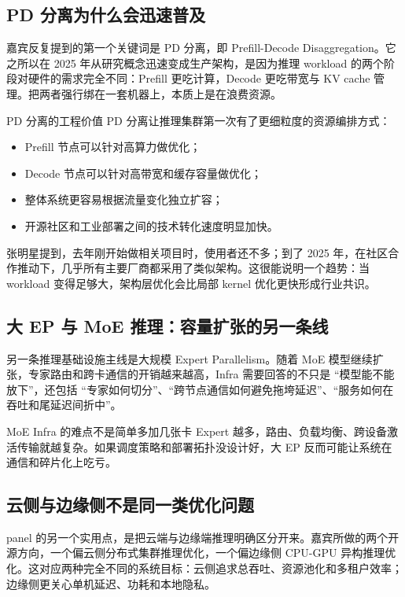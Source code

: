 \documentclass[a4paper]{article}
\begin{document}
\subsection{PD 分离为什么会迅速普及}
嘉宾反复提到的第一个关键词是 PD 分离，即 Prefill-Decode Disaggregation。它之所以在 2025 年从研究概念迅速变成生产架构，是因为推理 workload 的两个阶段对硬件的需求完全不同：Prefill 更吃计算，Decode 更吃带宽与 KV cache 管理。把两者强行绑在一套机器上，本质上是在浪费资源。

\begin{importantbox}{PD 分离的工程价值}
PD 分离让推理集群第一次有了更细粒度的资源编排方式：
\begin{itemize}
  \item Prefill 节点可以针对高算力做优化；
  \item Decode 节点可以针对高带宽和缓存容量做优化；
  \item 整体系统更容易根据流量变化独立扩容；
  \item 开源社区和工业部署之间的技术转化速度明显加快。
\end{itemize}
\end{importantbox}

张明星提到，去年刚开始做相关项目时，使用者还不多；到了 2025 年，在社区合作推动下，几乎所有主要厂商都采用了类似架构。这很能说明一个趋势：当 workload 变得足够大，架构层优化会比局部 kernel 优化更快形成行业共识。

\subsection{大 EP 与 MoE 推理：容量扩张的另一条线}
另一条推理基础设施主线是大规模 Expert Parallelism。随着 MoE 模型继续扩张，专家路由和跨卡通信的开销越来越高，Infra 需要回答的不只是 ``模型能不能放下''，还包括 ``专家如何切分''、``跨节点通信如何避免拖垮延迟''、``服务如何在吞吐和尾延迟间折中''。

\begin{warningbox}{MoE Infra 的难点不是简单多加几张卡}
Expert 越多，路由、负载均衡、跨设备激活传输就越复杂。如果调度策略和部署拓扑没设计好，大 EP 反而可能让系统在通信和碎片化上吃亏。
\end{warningbox}

\subsection{云侧与边缘侧不是同一类优化问题}
panel 的另一个实用点，是把云端与边缘端推理明确区分开来。嘉宾所做的两个开源方向，一个偏云侧分布式集群推理优化，一个偏边缘侧 CPU-GPU 异构推理优化。这对应两种完全不同的系统目标：云侧追求总吞吐、资源池化和多租户效率；边缘侧更关心单机延迟、功耗和本地隐私。
\end{document}

